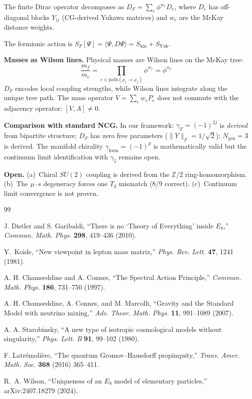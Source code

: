 \documentclass[12pt,a4paper]{article}
\theoremstyle{definition}
\begin{document}
The finite Dirac operator decomposes as $D_F = \sum_e \phi^{w_e} D_e$, where $D_e$ has off-diagonal blocks $Y_{ij}$ (CG-derived Yukawa matrices) and $w_e$ are the McKay distance weights.

The fermionic action is $S_F[\Psi] = \langle \Psi, D \Psi \rangle = S_{\mathrm{kin}} + S_{\mathrm{Yuk}}$.

\textbf{Masses as Wilson lines.}  Physical masses are Wilson lines on the McKay tree:
\begin{equation}
\frac{m_f}{m_e} = \prod_{e \in \mathrm{path}(\rho_1 \to \rho_f)} \phi^{w_e} = \phi^{n_f}
\end{equation}
$D_F$ encodes local coupling strengths, while Wilson lines integrate along the unique tree path.  The mass operator $V = \sum_e w_e P_e$ does not commute with the adjacency operator: $[V, A] \neq 0$.

\textbf{Comparison with standard NCG.}  In our framework: $\gamma_F = (-1)^{2j}$ is \emph{derived} from bipartite structure; $D_F$ has zero free parameters ($\|Y\|_F = 1/\sqrt{2}$); $N_{\mathrm{gen}} = 3$ is derived.  The manifold chirality $\gamma_{\mathrm{form}} = (-1)^p$ is mathematically valid but the continuum limit identification with $\gamma_5$ remains open.

\textbf{Open.}  (a)~Chiral $SU(2)$ coupling is derived from the $\mathbb{Z}/2$ ring-homomorphism.  (b)~The $\mu$--$s$ degeneracy forces one $T_3$ mismatch (8/9 correct).  (c)~Continuum limit convergence is not proven.


\begin{thebibliography}{99}

J. Distler and S. Garibaldi, ``There is no `Theory of Everything' inside $E_8$,'' \textit{Commun. Math. Phys.} \textbf{298}, 419--436 (2010).

Y.~Koide, ``New viewpoint in lepton mass matrix,'' \textit{Phys. Rev. Lett.} \textbf{47}, 1241 (1981).

A. H. Chamseddine and A. Connes, ``The Spectral Action Principle,'' \textit{Commun. Math. Phys.} \textbf{186}, 731--750 (1997).

A. H. Chamseddine, A. Connes, and M. Marcolli, ``Gravity and the Standard Model with neutrino mixing,'' \textit{Adv. Theor. Math. Phys.} \textbf{11}, 991--1089 (2007).

A. A. Starobinsky, ``A new type of isotropic cosmological models without singularity,'' \textit{Phys. Lett. B} \textbf{91}, 99--102 (1980).

F. Latr\'emoli\`ere, ``The quantum Gromov--Hausdorff propinquity,'' \textit{Trans. Amer. Math. Soc.} \textbf{368} (2016) 365--411.

R.~A. Wilson, ``Uniqueness of an $E_8$ model of elementary particles,'' arXiv:2407.18279 (2024).

\end{thebibliography}
\end{document}
